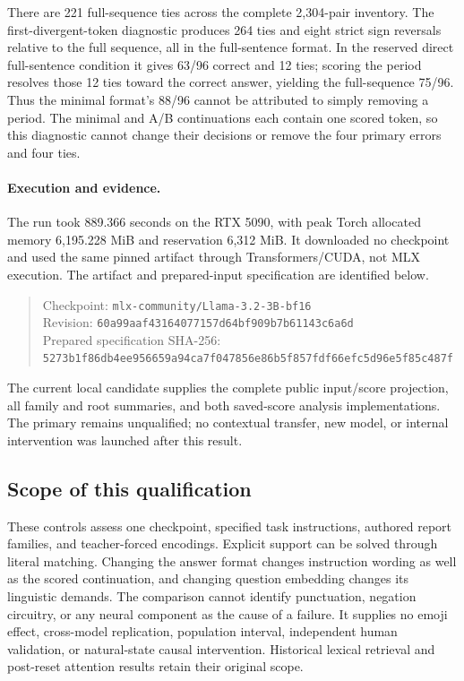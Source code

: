 There are 221 full-sequence ties across the complete 2,304-pair inventory.
The first-divergent-token diagnostic produces 264 ties and eight strict
sign reversals relative to the full sequence, all in the full-sentence format.
In the reserved direct full-sentence condition it gives 63/96 correct and
12 ties; scoring the period resolves those 12 ties toward the correct answer,
yielding the full-sequence 75/96. Thus the minimal format's 88/96 cannot be
attributed to simply removing a period. The minimal and A/B continuations
each contain one scored token, so this diagnostic cannot change their
decisions or remove the four primary errors and four ties.



\paragraph{Execution and evidence.}
The run took 889.366 seconds on the RTX 5090, with peak Torch allocated memory
6,195.228 MiB and reservation 6,312 MiB. It downloaded no checkpoint and used
the same pinned artifact through Transformers/CUDA, not MLX execution.
The artifact and prepared-input specification are identified below.
\begin{quote}\small\raggedright
Checkpoint: \texttt{mlx-community/Llama-3.2-3B-bf16}\\
Revision: \texttt{60a99aaf43164077157d64bf909b7b61143c6a6d}\\
Prepared specification SHA-256:\\
\texttt{5273b1f86db4ee956659a94ca7f047856e86b5f857fdf66efc5d96e5f85c487f}
\end{quote}
The current local candidate supplies the complete public input/score
projection, all family and root summaries, and both saved-score analysis
implementations. The primary remains unqualified; no contextual transfer,
new model, or internal intervention was launched after this result.

\subsection{Scope of this qualification}

These controls assess one checkpoint, specified task instructions, authored
report families, and teacher-forced encodings. Explicit support can be solved
through literal matching. Changing the answer format changes instruction
wording as well as the scored continuation, and changing question embedding
changes its linguistic demands. The comparison cannot identify punctuation,
negation circuitry, or any neural component as the cause of a failure.
It supplies no emoji effect, cross-model replication, population interval,
independent human validation, or natural-state causal intervention. Historical
lexical retrieval and post-reset attention results retain their original scope.
